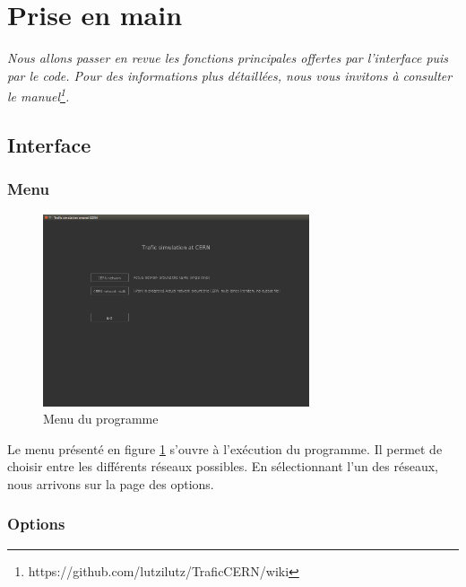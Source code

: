 \documentclass[a4paper,11pt, titlepage]{extarticle}
\begin{document}
\newpage

\section{Prise en main}

\emph{Nous allons passer en revue les fonctions principales offertes par l'interface puis par le code. Pour des informations plus détaillées, nous vous invitons à consulter le manuel\footnote{https://github.com/lutzilutz/TraficCERN/wiki}.}\newline

\subsection{Interface}

\subsubsection{Menu}

\begin{figure}[!h]
  \begin{center}
    \includegraphics[width=0.7\textwidth]{interface_menu.png}
  \end{center}
  \caption{Menu du programme}
  \label{imgMenu}
\end{figure}

Le menu présenté en figure \ref{imgMenu} s'ouvre à l'exécution du programme. Il permet de choisir entre les différents réseaux possibles. En sélectionnant l'un des réseaux, nous arrivons sur la page des options.

\subsubsection{Options}
\end{document}
